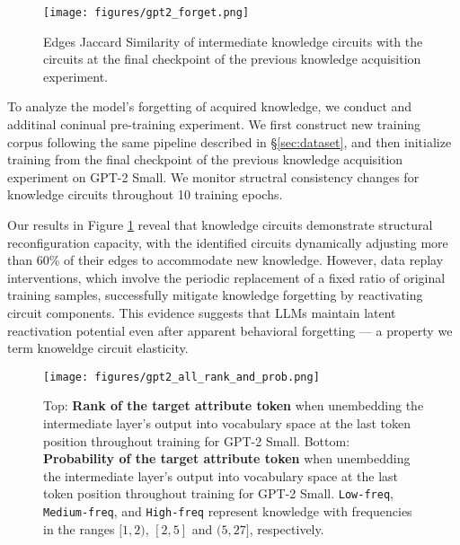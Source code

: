 \begin{figure}
    \centering
    \texttt{[image: figures/gpt2\_forget.png]}
    \caption{Edges Jaccard Similarity of intermediate knowledge circuits with the circuits at the final checkpoint of the previous knowledge acquisition experiment.}
    \label{fig:gpt2_forget}
    \vspace{-10pt}
\end{figure}



To analyze the model's forgetting of acquired knowledge, we conduct and additinal coninual pre-training experiment.
We first construct new training corpus following the same pipeline described in \S\ref{sec:dataset}, and then initialize training from the final checkpoint of the previous knowledge acquisition experiment on GPT-2 Small.
We monitor structral consistency changes for knowledge circuits throughout 10 training epochs.

Our results in Figure \ref{fig:gpt2_forget} reveal that knowledge circuits demonstrate structural reconfiguration capacity, with the identified circuits dynamically adjusting more than 60\% of their edges to accommodate new knowledge.
However, data replay interventions, which involve the periodic replacement of a fixed ratio of original training samples, successfully mitigate knowledge forgetting by reactivating circuit components.
This evidence suggests that LLMs maintain latent reactivation potential even after apparent behavioral forgetting — a property we term knoweldge circuit elasticity.


\begin{figure*}
    \centering
    \texttt{[image: figures/gpt2\_all\_rank\_and\_prob.png]}
    \caption{Top: \textbf{Rank of the target attribute token} when unembedding the intermediate layer’s output into vocabulary space at the last token position throughout training for GPT-2 Small. Bottom: \textbf{Probability of the target attribute token} when unembedding the intermediate layer’s output into vocabulary space at the last token position throughout training for GPT-2 Small. \texttt{Low-freq}, \texttt{Medium-freq}, and \texttt{High-freq} represent knowledge with frequencies in the ranges $[1, 2)$, $[2,5]$ and $(5, 27]$, respectively.}
    \label{fig:gpt2_all_rank_and_prob}
    \vspace{-10pt}
\end{figure*}

